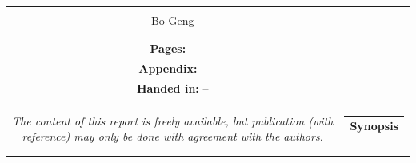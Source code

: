 \begin{titlepage}
\begin{nopagebreak}
{\begin{tabular}{cc}
{{\textbf{Supervisors:}\\
Bo Geng

}\\
\\
\\
\textbf{Pages:} --\\
\textbf{Appendix:} -- \\
\textbf{Handed in:} --\\
\\
\textit{The content of this report is freely available, but publication (with reference) may only be done with
	agreement with the authors.}
\vfill } &
\parbox{7cm}{
  \vspace{.15cm}
  \hfill
  \begin{tabular}{l}
  {\textbf{Synopsis}}\bigskip \\
  \fbox{
    \parbox{6.5cm}{\bigskip
     {\vfill{\small 
     \bigskip}}
     }}
   \end{tabular}}
\end{tabular}} %



\end{nopagebreak}
\end{titlepage}
%